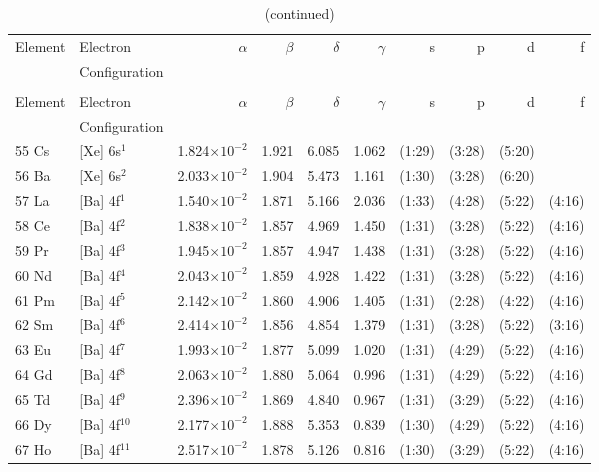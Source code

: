 \begin{longtable}{l l r r r r r r r r}
\caption[Basis sets optimized using cudaDFRATOM]{Basis sets optimized using cudaDFRATOM}
\label{tab:BStab_rel} \\
\toprule
	Element	&	Electron		&	$\alpha$	&	$\beta$	&	$\delta$	&	$\gamma$	&	s	&	p	&	d	&	f	\\
			&	Configuration	&			&			&			&				&		&		&		&		\\
\midrule
\endfirsthead
\caption[]{(continued)}\\
\toprule
	Element	&	Electron		&	$\alpha$	&	$\beta$	&	$\delta$	&	$\gamma$	&	s	&	p	&	d	&	f	\\
			&	Configuration	&			&			&			&				&		&		&		&		\\
\midrule
\endhead
55 Cs		&	[Xe] 6s$^{1}$	&	1.824$\times10^{-2}$	&	1.921	&	6.085	&	1.062	&	(1:29)	&	 (3:28)	&	 (5:20)	\\
56 Ba		&	[Xe] 6s$^{2}$	&	2.033$\times10^{-2}$	&	1.904	&	5.473	&	1.161	&	(1:30)	&	 (3:28)	&	 (6:20)	\\
57 La		&	[Ba] 4f$^{1}$	&	1.540$\times10^{-2}$	&	1.871	&	5.166	&	2.036	&	(1:33)	&	 (4:28)	&	 (5:22)	&	 (4:16)\\
58 Ce		&	[Ba] 4f$^{2}$	&	1.838$\times10^{-2}$	&	1.857	&	4.969	&	1.450	&	(1:31)	&	 (3:28)	&	 (5:22)	&	 (4:16)\\
59 Pr		&	[Ba] 4f$^{3}$	&	1.945$\times10^{-2}$	&	1.857	&	4.947	&	1.438	&	(1:31)	&	 (3:28)	&	 (5:22)	&	 (4:16)\\
60 Nd		&	[Ba] 4f$^{4}$	&	2.043$\times10^{-2}$	&	1.859	&	4.928	&	1.422	&	(1:31)	&	 (3:28)	&	 (5:22)	&	 (4:16)\\
61 Pm		&	[Ba] 4f$^{5}$	&	2.142$\times10^{-2}$	&	1.860	&	4.906	&	1.405	&	(1:31)	&	 (2:28)	&	 (4:22)	&	 (4:16)\\
62 Sm		&	[Ba] 4f$^{6}$	&	2.414$\times10^{-2}$	&	1.856	&	4.854	&	1.379	&	(1:31)	&	 (3:28)	&	 (5:22)	&	 (3:16)\\
63 Eu		&	[Ba] 4f$^{7}$	&	1.993$\times10^{-2}$	&	1.877	&	5.099	&	1.020	&	(1:31)	&	 (4:29)	&	 (5:22)	&	 (4:16)\\
64 Gd		&	[Ba] 4f$^{8}$	&	2.063$\times10^{-2}$	&	1.880	&	5.064	&	0.996	&	(1:31)	&	 (4:29)	&	 (5:22)	&	 (4:16)\\
65 Td		&	[Ba] 4f$^{9}$	&	2.396$\times10^{-2}$	&	1.869	&	4.840	&	0.967	&	(1:31)	&	 (3:29)	&	 (5:22)	&	 (4:16)\\
66 Dy		&	[Ba] 4f$^{10}$	&	2.177$\times10^{-2}$	&	1.888	&	5.353	&	0.839	&	(1:30)	&	 (4:29)	&	 (5:22)	&	 (4:16)\\
67 Ho		&	[Ba] 4f$^{11}$	&	2.517$\times10^{-2}$	&	1.878	&	5.126	&	0.816	&	(1:30)	&	 (3:29)	&	 (5:22)	&	 (4:16)\\

\end{longtable}
